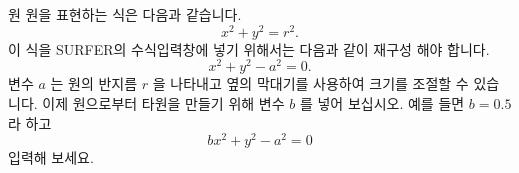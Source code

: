 \begin{surferPage}{원}
원을 표현하는 식은 다음과 같습니다.
\[x^2+y^2=r^2.\]
이 식을 SURFER의 수식입력창에 넣기 위해서는 다음과 같이 재구성 해야 합니다.
\[x^2+y^2-a^2=0.\]
변수 $a$ 는 원의 반지름 $r$ 을 나타내고 옆의 막대기를 사용하여 크기를 조절할 수 있습니다. 이제 원으로부터 타원을 만들기 위해 변수 $b$ 를 넣어 보십시오. 예를 들면 $b=0.5$ 라 하고 \[bx^2+y^2-a^2=0\] 입력해 보세요.
\end{surferPage}
